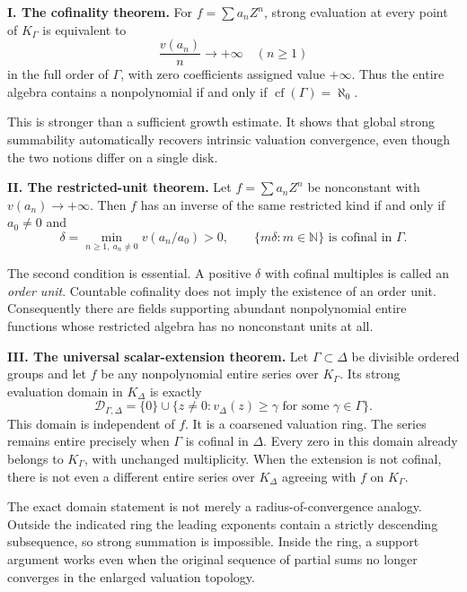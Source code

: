 \documentclass[11pt,letterpaper]{article}
\numberwithin{equation}{section}
\theoremstyle{definition}
\theoremstyle{remark}
\newcommand{\N}{\mathbb N}
\newcommand{\cf}{\operatorname{cf}}
\begin{document}
\begin{scopebox}
\textbf{I. The cofinality theorem.}
For $f=\sum a_nZ^n$, strong evaluation at every point of $K_\Gamma$ is equivalent to
\[
 \frac{v(a_n)}{n}\longrightarrow+\infty\quad(n\ge1)
\]
in the full order of $\Gamma$, with zero coefficients assigned value $+\infty$.
Thus the entire algebra contains a nonpolynomial if and only if
$\cf(\Gamma)=\aleph_0$.
\end{scopebox}

This is stronger than a sufficient growth estimate. It shows that global
strong summability automatically recovers intrinsic valuation convergence,
even though the two notions differ on a single disk.

\begin{scopebox}
\textbf{II. The restricted-unit theorem.}
Let $f=\sum a_nZ^n$ be nonconstant with $v(a_n)\to+\infty$. Then $f$ has an
inverse of the same restricted kind if and only if $a_0\ne0$ and
\[
 \delta=\min_{n\ge1,\ a_n\ne0}v(a_n/a_0)>0,
 \qquad \{m\delta:m\in\N\}\text{ is cofinal in }\Gamma.
\]
\end{scopebox}

The second condition is essential. A positive $\delta$ with cofinal multiples
is called an \emph{order unit}. Countable cofinality does not imply the
existence of an order unit. Consequently there are fields supporting abundant
nonpolynomial entire functions whose restricted algebra has no nonconstant
units at all.

\begin{scopebox}
\textbf{III. The universal scalar-extension theorem.}
Let $\Gamma\subset\Delta$ be divisible ordered groups and let $f$ be any
nonpolynomial entire series over $K_\Gamma$. Its strong evaluation domain
in $K_\Delta$ is exactly
\[
 \mathcal D_{\Gamma,\Delta}
 =\{0\}\cup\{z\ne0:v_\Delta(z)\ge\gamma
                       \text{ for some }\gamma\in\Gamma\}.
\]
This domain is independent of $f$. It is a coarsened valuation ring.
The series remains entire precisely when $\Gamma$ is cofinal in $\Delta$.
Every zero in this domain already belongs to $K_\Gamma$, with unchanged
multiplicity. When the extension is not cofinal, there is not even a different
entire series over $K_\Delta$ agreeing with $f$ on $K_\Gamma$.
\end{scopebox}

The exact domain statement is not merely a radius-of-convergence analogy.
Outside the indicated ring the leading exponents contain a strictly descending
subsequence, so strong summation is impossible. Inside the ring, a support
argument works even when the original sequence of partial sums no longer
converges in the enlarged valuation topology.
\end{document}

